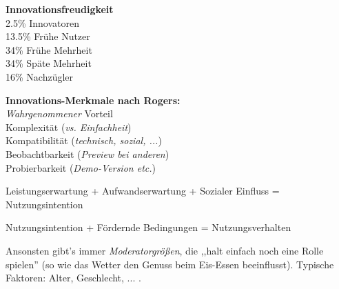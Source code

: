 \begin{multicols}{2}
\textbf{Innovationsfreudigkeit}\\
2.5\% Innovatoren\\
13.5\% Frühe Nutzer\\
34\% Frühe Mehrheit\\
34\% Späte Mehrheit\\
16\% Nachzügler

\textbf{Innovations-Merkmale nach Rogers:}\\
\emph{Wahrgenommener} Vorteil\\
Komplexität (\emph{vs. Einfachheit})\\
Kompatibilität (\emph{technisch, sozial, ...})\\
Beobachtbarkeit (\emph{Preview bei anderen})\\
Probierbarkeit (\emph{Demo-Version etc.})
\end{multicols}

Leistungserwartung + Aufwandserwartung + Sozialer Einfluss = Nutzungsintention

Nutzungsintention + Fördernde Bedingungen = Nutzungsverhalten

Ansonsten gibt's immer \emph{Moderatorgrößen}, die ,,halt einfach noch eine
Rolle spielen'' (so wie das Wetter den Genuss beim Eis-Essen beeinflusst). Typische
Faktoren: Alter, Geschlecht, ... .
